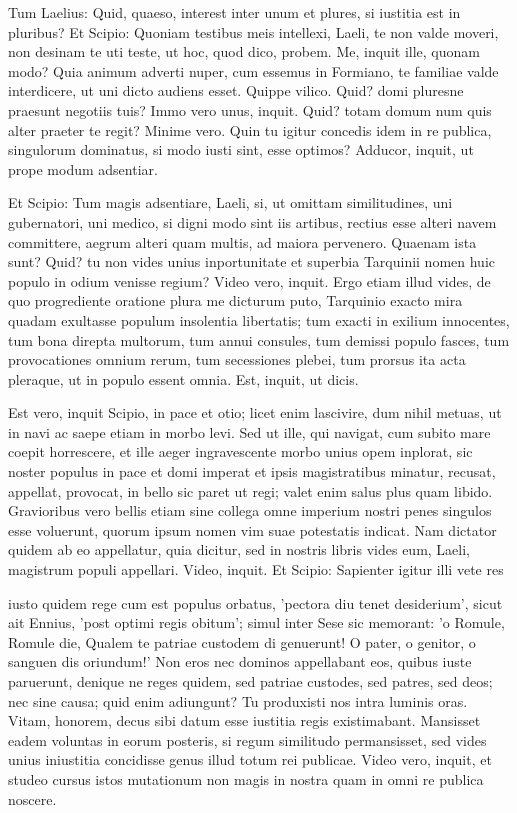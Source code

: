  Tum Laelius: Quid, quaeso, interest inter unum et plures, si iustitia est in pluribus? Et Scipio: Quoniam testibus meis intellexi, Laeli, te non valde moveri, non desinam te uti teste, ut hoc, quod dico, probem. Me, inquit ille, quonam modo? Quia animum adverti nuper, cum essemus in Formiano, te familiae valde interdicere, ut uni dicto audiens esset. Quippe vilico. Quid? domi pluresne praesunt negotiis tuis? Immo vero unus, inquit. Quid? totam domum num quis alter praeter te regit? Minime vero. Quin tu igitur concedis idem in re publica, singulorum dominatus, si modo iusti sint, esse optimos? Adducor, inquit, ut prope modum adsentiar.

 Et Scipio: Tum magis adsentiare, Laeli, si, ut omittam similitudines, uni gubernatori, uni medico, si digni modo sint iis artibus, rectius esse alteri navem committere, aegrum alteri quam multis, ad maiora pervenero. Quaenam ista sunt? Quid? tu non vides unius inportunitate et superbia Tarquinii nomen huic populo in odium venisse regium? Video vero, inquit. Ergo etiam illud vides, de quo progrediente oratione plura me dicturum puto, Tarquinio exacto mira quadam exultasse populum insolentia libertatis; tum exacti in exilium innocentes, tum bona direpta multorum, tum annui consules, tum demissi populo fasces, tum provocationes omnium rerum, tum secessiones plebei, tum prorsus ita acta pleraque, ut in populo essent omnia. Est, inquit, ut dicis.

 Est vero, inquit Scipio, in pace et otio; licet enim lascivire, dum nihil metuas, ut in navi ac saepe etiam in morbo levi. Sed ut ille, qui navigat, cum subito mare coepit horrescere, et ille aeger ingravescente morbo unius opem inplorat, sic noster populus in pace et domi imperat et ipsis magistratibus minatur, recusat, appellat, provocat, in bello sic paret ut regi; valet enim salus plus quam libido. Gravioribus vero bellis etiam sine collega omne imperium nostri penes singulos esse voluerunt, quorum ipsum nomen vim suae potestatis indicat. Nam dictator quidem ab eo appellatur, quia dicitur, sed in nostris libris vides eum, Laeli, magistrum populi appellari. Video, inquit. Et Scipio: Sapienter igitur illi vete res

 iusto quidem rege cum est populus orbatus, 'pectora diu tenet desiderium', sicut ait Ennius, 'post optimi regis obitum'; simul inter Sese sic memorant: 'o Romule, Romule die, Qualem te patriae custodem di genuerunt! O pater, o genitor, o sanguen dis oriundum!' Non eros nec dominos appellabant eos, quibus iuste paruerunt, denique ne reges quidem, sed patriae custodes, sed patres, sed deos; nec sine causa; quid enim adiungunt? Tu produxisti nos intra luminis oras. Vitam, honorem, decus sibi datum esse iustitia regis existimabant. Mansisset eadem voluntas in eorum posteris, si regum similitudo permansisset, sed vides unius iniustitia concidisse genus illud totum rei publicae. Video vero, inquit, et studeo cursus istos mutationum non magis in nostra quam in omni re publica noscere.


